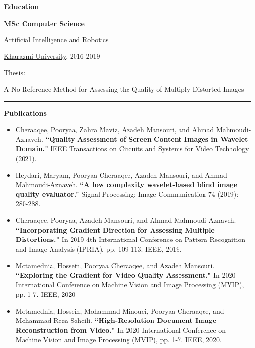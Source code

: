 \documentclass{letter}
\begin{document}
\begin{multicols}{2}

\begin{Large}
	\textbf{Education}
\end{Large}

\textbf{MSc Computer Science}

Artificial Intelligence and Robotics

\href{https://khu.ac.ir/en}{Kharazmi University}, 2016-2019

Thesis:

A No-Reference Method for Assessing the Quality of Multiply Distorted Images

	\noindent \rule{\columnwidth}{2pt}

\begin{Large}
	\textbf{Publications}
\end{Large}
	\begin{itemize}

		\item Cheraaqee, Pooryaa, Zahra Maviz, Azadeh Mansouri, and Ahmad Mahmoudi-Aznaveh. \textbf{``Quality Assessment of Screen Content Images in Wavelet Domain."} IEEE Transactions on Circuits and Systems for Video Technology (2021).

		\item Heydari, Maryam, Pooryaa Cheraaqee, Azadeh Mansouri, and Ahmad Mahmoudi-Aznaveh. \textbf{``A low complexity wavelet-based blind image quality evaluator."} Signal Processing: Image Communication 74 (2019): 280-288.

		\item Cheraaqee, Pooryaa, Azadeh Mansouri, and Ahmad Mahmoudi-Aznaveh. \textbf{``Incorporating Gradient Direction for Assessing Multiple Distortions."} In 2019 4th International Conference on Pattern Recognition and Image Analysis (IPRIA), pp. 109-113. IEEE, 2019.

		\item Motamednia, Hossein, Pooryaa Cheraaqee, and Azadeh Mansouri. \textbf{``Exploring the Gradient for Video Quality Assessment."} In 2020 International Conference on Machine Vision and Image Processing (MVIP), pp. 1-7. IEEE, 2020.

		\item Motamednia, Hossein, Mohammad Minouei, Pooryaa Cheraaqee, and Mohammad Reza Soheili. \textbf{``High-Resolution Document Image Reconstruction from Video."} In 2020 International Conference on Machine Vision and Image Processing (MVIP), pp. 1-7. IEEE, 2020.


\end{itemize}
\end{multicols}
\end{document}
